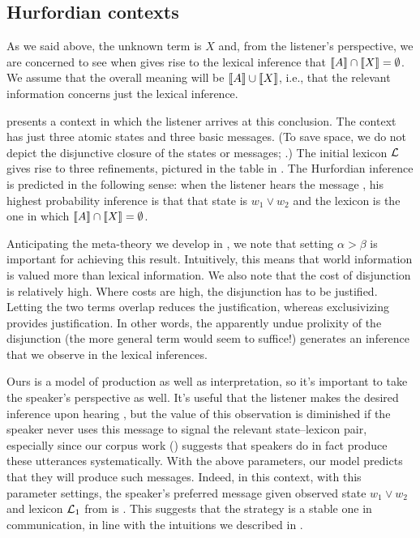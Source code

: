 \documentclass{article}
\begin{document}

\subsection{Hurfordian contexts}\label{sec:analysis:subsumptive}

As we said above, the unknown term is $X$ and, from the listener's
perspective, we are concerned to see when  gives rise to
the lexical inference that $\llbracket A\rrbracket \cap \llbracket X\rrbracket = \emptyset$. We
assume that the overall meaning will be $\llbracket A\rrbracket \cup \llbracket X\rrbracket$, i.e.,
that the relevant information concerns just the lexical inference.

 presents a context in which the listener arrives
at this conclusion. The context has just three atomic states and three
basic messages. (To save space, we do not depict the disjunctive
closure of the states or messages; .) The
initial lexicon $\mathcal{L}$ gives rise to three refinements, pictured in
the table in . The Hurfordian inference is
predicted in the following sense: when the listener hears the message
, his highest probability inference is that that state is
$w_{1} \vee w_{2}$ and the lexicon is the one in which
$\llbracket A\rrbracket \cap \llbracket X\rrbracket = \emptyset$.

Anticipating the meta-theory we develop in
, we note that setting
$\alpha > \beta$ is important for achieving this result. Intuitively,
this means that world information is valued more than lexical
information. We also note that the cost of disjunction is relatively
high. Where costs are high, the disjunction has to be
justified. Letting the two terms overlap reduces the justification,
whereas exclusivizing provides justification. In other words, the
apparently undue prolixity of the disjunction (the more general term
would seem to suffice!) generates an inference that we observe in the
lexical inferences.

Ours is a model of production as well as interpretation, so it's
important to take the speaker's perspective as well. It's useful that
the listener makes the desired inference upon hearing ,
but the value of this observation is diminished if the speaker never
uses this message to signal the relevant state--lexicon pair,
especially since our corpus work ()
suggests that speakers do in fact produce these utterances
systematically. With the above parameters, our model predicts that
they will produce such messages. Indeed, in this context, with this
parameter settings, the speaker's preferred message given observed
state $w_{1} \vee w_{2}$ and lexicon $\mathcal{L}_{1}$ from
 is .  This suggests that the
strategy is a stable one in communication, in line with the intuitions
we described in .
\end{document}
